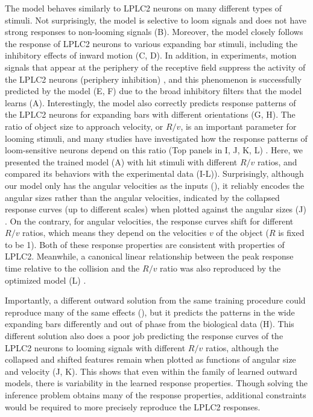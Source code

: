 \documentclass[pdftex,9pt,lineno]{elife}
\begin{document}
The model behaves similarly to LPLC2 neurons on many different types of stimuli. Not surprisingly, the model is selective to loom signals and does not have strong responses to non-looming signals (B). Moreover, the model closely follows the response of LPLC2 neurons to various expanding bar stimuli, including the inhibitory effects of inward motion (C, D). In addition, in experiments, motion signals that appear at the periphery of the receptive field suppress the activity of the LPLC2 neurons (periphery inhibition) \citep{klapoetke2017ultra}, and this phenomenon is successfully predicted by the model (E, F) due to the broad inhibitory filters that the model learns (A). Interestingly, the model also correctly predicts response patterns of the LPLC2 neurons for expanding bars with different orientations (G, H). 
The ratio of object size to approach velocity, or $R/v$, is an important parameter for looming stimuli, and many studies have investigated how the response patterns of loom-sensitive neurons depend on this ratio (Top panels in I, J, K, L) \citep{gabbiani1999computation,von2017feature,ache2019neural}. Here, we presented the trained model (A) with hit stimuli with different $R/v$ ratios, and compared its behaviors with the experimental data (I-L)). Surprisingly, although our model only has the angular velocities as the inputs (), it reliably encodes the angular sizes rather than the angular velocities, indicated by the collapsed response curves (up to different scales) when plotted against the angular sizes (J) \citep{von2017feature}. On the contrary, for angular velocities, the response curves shift for different $R/v$ ratios, which means they depend on the velocities $v$ of the object ($R$ is fixed to be 1). Both of these response properties are consistent with properties of LPLC2. Meanwhile, a canonical linear relationship between the peak response time relative to the collision and the $R/v$ ratio was also reproduced by the optimized model (L) \citep{gabbiani1999computation,ache2019neural}. 

Importantly, a different outward solution from the same training procedure could reproduce many of the same effects (), but it predicts the patterns in the wide expanding bars differently and out of phase from the biological data (H). This different solution also does a poor job predicting the response curves of the LPLC2 neurons to looming signals with different $R/v$ ratios, although the collapsed and shifted features remain when plotted as functions of angular size and velocity (J, K). This shows that even within the family of learned outward models, there is variability in the learned response properties. Though solving the inference problem obtains many of the response properties, additional constraints would be required to more precisely reproduce the LPLC2 responses.
\end{document}
